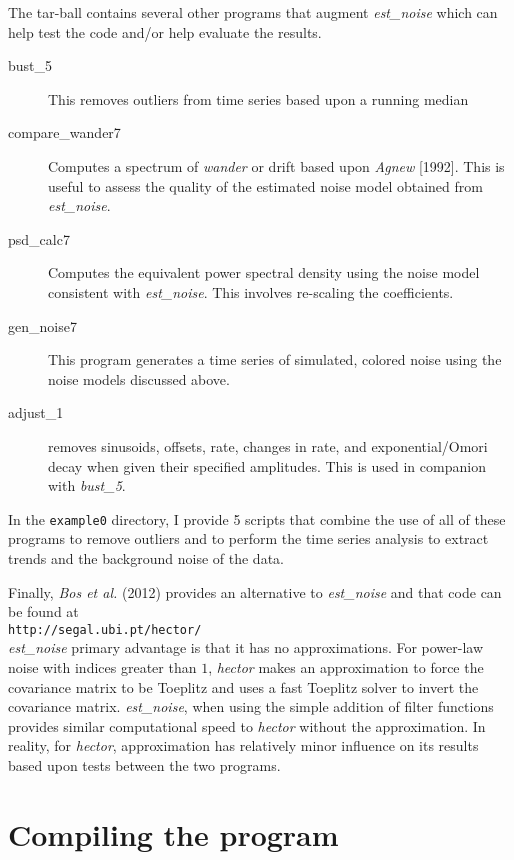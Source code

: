 \documentclass[12pt]{amsart}
\begin{document}
The tar-ball contains several other programs that augment \textit{est\_noise} which can help test the code and/or help evaluate the results.
\begin{description}
\item[bust\_5]  This removes outliers from time series based upon a running median
\item[compare\_wander7]  Computes a spectrum of \textit{wander} or drift based upon \textit{Agnew} [1992]. This is
useful to assess the quality of the estimated noise model obtained from \textit{est\_noise}.  
\item[psd\_calc7] Computes the equivalent power spectral density using the noise model consistent with \textit{est\_noise}.
This involves re-scaling the coefficients.
\item[gen\_noise7] This program generates a time series of simulated, colored noise using the noise models discussed
above.
\item[adjust\_1]  removes sinusoids, offsets, rate, changes in rate, and exponential/Omori decay when given their
specified amplitudes. This is used in companion with \textit{bust\_5}.
\end{description}

In the \texttt{example0} directory, I provide 5 scripts that combine the use of all of these programs to remove outliers
and to perform the time series analysis to extract trends and the background noise of the data. 

Finally, \textit{Bos et al.} (2012) provides an alternative to \textit{est\_noise} and that code can be found
at
\\
\texttt{http://segal.ubi.pt/hector/}
\\
\textit{est\_noise} primary advantage is that it has no approximations.  For power-law noise with indices greater than $1$,
\textit{hector} makes an approximation to force the covariance matrix to be Toeplitz and uses a fast Toeplitz solver
to invert the covariance matrix. \textit{est\_noise}, when using the simple addition of filter functions provides similar computational
speed to \textit{hector} without the approximation. In reality, for \textit{hector}, approximation has relatively minor influence on
its results based upon tests between the two programs.


\section{Compiling the program}
\end{document}
